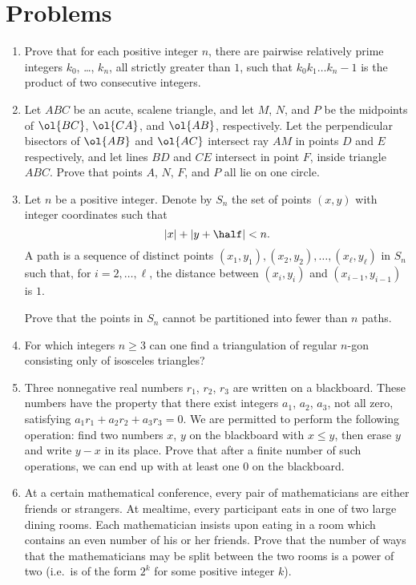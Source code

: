 \documentclass[11pt]{scrartcl}
\begin{document}
\section{Problems}
\begin{enumerate}[\bfseries 1.]
\item %
Prove that for each positive integer $n$,
there are pairwise relatively prime integers $k_0$, \dots, $k_n$,
all strictly greater than $1$, such that
$k_0k_1 \dots k_n - 1$ is the product of two consecutive integers.

\item %
Let $ABC$ be an acute, scalene triangle,
and let $M$, $N$, and $P$ be the midpoints of
$\ol{BC}$, $\ol{CA}$, and $\ol{AB}$, respectively.
Let the perpendicular bisectors of $\ol{AB}$ and $\ol{AC}$
intersect ray $AM$ in points $D$ and $E$ respectively,
and let lines $BD$ and $CE$ intersect in point $F$, inside triangle $ABC$.
Prove that points $A$, $N$, $F$, and $P$ all lie on one circle.

\item %
Let $n$ be a positive integer.  Denote by $S_n$ the set of points $(x, y)$
with integer coordinates such that
\[ \left\lvert x\right\rvert + \left\lvert y + \half \right\rvert < n. \]
A path is a sequence of distinct points
$(x_1 , y_1), (x_2, y_2), \dots, (x_\ell, y_\ell)$ in $S_n$
such that, for $i = 2, \dots, \ell$,
the distance between $(x_i , y_i)$ and $(x_{i-1} , y_{i-1} )$ is $1$.

Prove that the points in $S_n$ cannot be partitioned into fewer than $n$ paths.

\item %
For which integers $n \ge 3$ can one find a triangulation
of regular $n$-gon consisting only of isosceles triangles?

\item %
Three nonnegative real numbers $r_1$, $r_2$, $r_3$
are written on a blackboard.
These numbers have the property
that there exist integers $a_1$, $a_2$, $a_3$, not all zero,
satisfying $a_1r_1 + a_2r_2 + a_3r_3 = 0$.
We are permitted to perform the following operation:
find two numbers $x$, $y$ on the blackboard with $x \le y$,
then erase $y$ and write $y - x$ in its place.
Prove that after a finite number of such operations,
we can end up with at least one $0$ on the blackboard.

\item %
At a certain mathematical conference,
every pair of mathematicians are either friends or strangers.
At mealtime, every participant eats in one of two large dining rooms.
Each mathematician insists upon eating in a room which
contains an even number of his or her friends.
Prove that the number of ways that the mathematicians
may be split between the two rooms is a power of two
(i.e.\ is of the form $2^k$ for some positive integer $k$).

\end{enumerate}
\pagebreak
\end{document}
